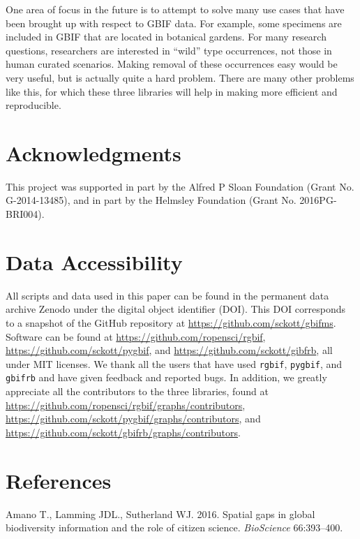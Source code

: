 \documentclass[author-year, review, 11pt]{components/elsarticle} %
\begin{document}
One area of focus in the future is to attempt to solve many use cases
that have been brought up with respect to GBIF data. For example, some
specimens are included in GBIF that are located in botanical gardens.
For many research questions, researchers are interested in ``wild'' type
occurrences, not those in human curated scenarios. Making removal of
these occurrences easy would be very useful, but is actually quite a
hard problem. There are many other problems like this, for which these
three libraries will help in making more efficient and reproducible.

\section{Acknowledgments}\label{acknowledgments}

This project was supported in part by the Alfred P Sloan Foundation
(Grant No. G-2014-13485), and in part by the Helmsley Foundation (Grant
No. 2016PG-BRI004).

\section{Data Accessibility}\label{data-accessibility}

All scripts and data used in this paper can be found in the permanent
data archive Zenodo under the digital object identifier (DOI). This DOI
corresponds to a snapshot of the GitHub repository at
\url{https://github.com/sckott/gbifms}. Software can be found at
\url{https://github.com/ropensci/rgbif},
\url{https://github.com/sckott/pygbif}, and
\url{https://github.com/sckott/gibfrb}, all under MIT licenses. We thank
all the users that have used \texttt{rgbif}, \texttt{pygbif}, and
\texttt{gbifrb} and have given feedback and reported bugs. In addition,
we greatly appreciate all the contributors to the three libraries, found
at \url{https://github.com/ropensci/rgbif/graphs/contributors},
\url{https://github.com/sckott/pygbif/graphs/contributors}, and
\url{https://github.com/sckott/gbifrb/graphs/contributors}.

\section*{References}\label{references}

\hypertarget{refs}{}
\hypertarget{ref-Amano_2016}{}
Amano T., Lamming JDL., Sutherland WJ. 2016. Spatial gaps in global
biodiversity information and the role of citizen science.
\emph{BioScience} 66:393--400.
\end{document}

